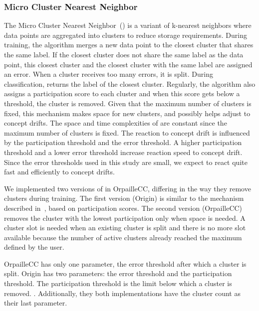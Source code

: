 \subsubsection{Micro Cluster Nearest Neighbor~\cite{mc-nn}}
The Micro Cluster Nearest Neighbor~(\mcnn) is a variant of k-nearest neighbors
where data points are aggregated into clusters to reduce storage requirements.
During training, the algorithm merges a new data point to the closest cluster
that shares the same label. If the closest cluster does not share the same label
as the data point, this closest cluster and the closest cluster with the same
label are assigned an error. When a cluster receives too many errors, it is
split. During classification, \mcnn returns the label of the closest cluster.
Regularly, the algorithm also assigns a participation score to each cluster and
when this score gets below a threshold, the cluster is removed.  Given that the
maximum number of clusters is fixed, this mechanism makes space for new
clusters, and possibly helps adjust to concept drifts.  The space and time
complexities of \mcnn are constant since the maximum number of clusters is
fixed.  The reaction to concept drift is influenced by the participation
threshold and the error threshold.  A higher participation threshold and a lower
error threshold increase reaction speed to concept drift. Since the error
thresholds used in this study are small, we expect \mcnn to react quite fast and
efficiently to concept drifts.

We implemented two versions of \mcnn in OrpailleCC, differing in the way they
remove clusters during training. The first version (\mcnn Origin) is similar to
the mechanism described in~\cite{mc-nn}, based on participation scores.  The
second version (\mcnn OrpailleCC) removes the cluster with the lowest
participation only when space is needed.  A cluster slot is needed when an
existing cluster is split and there is no more slot available because the number
of active clusters already reached the maximum defined by the user.

\mcnn OrpailleCC has only one parameter, the error threshold after which a
cluster is split.  \mcnn Origin has two parameters: the error threshold and the
participation threshold. The participation threshold is the limit below which a
cluster is removed. . Additionally, they both implementations have the cluster count as their
last parameter.

